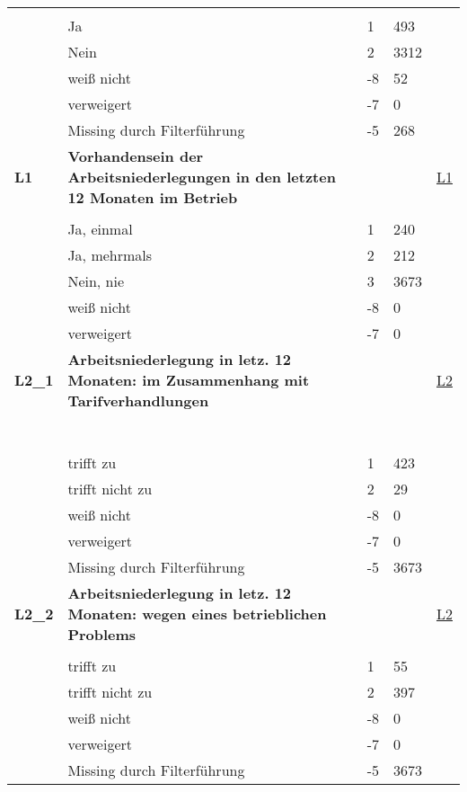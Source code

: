 \begin{longtable}{| L{2.5cm} | L{8.25cm}| C{1.5cm} | R{1.25cm} | C{2.25cm} |  }
   &  &  &  &  \\ 
   & Ja & 1 & 493 &  \\ 
   & Nein & 2 & 3312 &  \\ 
   & weiß nicht & -8 & 52 &  \\ 
   & verweigert & -7 & 0 &  \\ 
   & Missing durch Filterführung & -5 & 268 &  \\ 
   \midrule
\textbf{L1}\label{var:suf:L1} & \textbf{Vorhandensein der Arbeitsniederlegungen in den letzten 12 Monaten im Betrieb} &  &  & \hyperref[L1]{L1} \\ 
   &  &  &  &  \\ 
   & Ja, einmal & 1 & 240 &  \\ 
   & Ja, mehrmals & 2 & 212 &  \\ 
   & Nein, nie & 3 & 3673 &  \\ 
   & weiß nicht & -8 & 0 &  \\ 
   & verweigert & -7 & 0 &  \\ 
   \midrule
\textbf{L2\_1}\label{var:suf:L2:1} & \textbf{Arbeitsniederlegung in letz. 12 Monaten: im Zusammenhang mit Tarifverhandlungen} &  &  & \hyperref[L2]{L2} \\ 
   & \protect\subsection[Variablen L2\_1 bis O1]{} &  &  &  \\ 
   & trifft zu & 1 & 423 &  \\ 
   & trifft nicht zu & 2 & 29 &  \\ 
   & weiß nicht & -8 & 0 &  \\ 
   & verweigert & -7 & 0 &  \\ 
   & Missing durch Filterführung & -5 & 3673 &  \\ 
   \midrule
\textbf{L2\_2}\label{var:suf:L2:2} & \textbf{Arbeitsniederlegung in letz. 12 Monaten: wegen eines betrieblichen Problems} &  &  & \hyperref[L2]{L2} \\ 
   &  &  &  &  \\ 
   & trifft zu & 1 & 55 &  \\ 
   & trifft nicht zu & 2 & 397 &  \\ 
   & weiß nicht & -8 & 0 &  \\ 
   & verweigert & -7 & 0 &  \\ 
   & Missing durch Filterführung & -5 & 3673 &  \\ 

\end{longtable}
